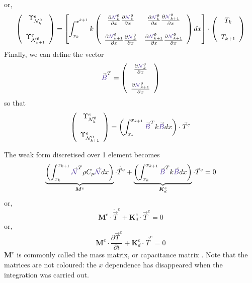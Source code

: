 or,
\[
\left(
\begin{array}{cc}
{\Upsilon}_{\bN_k^\uptheta}^e \\ \\ 
{\Upsilon}_{\bN_{k+1}^\uptheta}^e
\end{array}
\right)
=
\left[
\int_{x_k}^{x^{k+1}}
k
\left(
\begin{array}{cc}
\frac{\partial {\color{Violet}\bN}_k^\uptheta}{\partial x}  \frac{\partial  
{\color{Violet}\bN}_{k}^\uptheta } {\partial x}   & 
\frac{\partial {\color{Violet}\bN}_k^\uptheta}{\partial x}  \frac{\partial  
{\color{Violet}\bN}_{k+1}^\uptheta } {\partial x}  
\\ \\
\frac{\partial {\color{Violet}\bN}_{k+1}^\uptheta}{\partial x}  \frac{\partial  
{\color{Violet}\bN}_{k}^\uptheta } {\partial x}   & 
\frac{\partial {\color{Violet}\bN}_{k+1}^\uptheta}{\partial x}  \frac{\partial  
{\color{Violet}\bN}_{k+1}^\uptheta } {\partial x}  
\end{array}
\right)
dx
\right]
\cdot
\left(
\begin{array}{c}
T_k \\ \\ T_{k+1}
\end{array}
\right)
\]
Finally, we can define the vector 
\[
{\vec {\color{Violet}B}}^T=
\left(
\begin{array}{cc}
\frac{\partial {\color{Violet}\bN}_k^\uptheta}{\partial x}   \\ \\
\frac{\partial {\color{Violet}\bN}_{k+1}^\uptheta}{\partial x}
\end{array}
\right)
\]
so that 
\[
\left(
\begin{array}{cc}
{\Upsilon}_{\bN_k^\uptheta}^e \\ \\ 
{\Upsilon}_{\bN_{k+1}^\uptheta}^e
\end{array}
\right)
=
\left( \int_{x_k}^{x_{k+1}}   {\vec {\color{Violet}B}}^T 
k {\vec {\color{Violet}B}} dx  \right) \cdot {\vec T}^e
\]

The weak form discretised over 1 element becomes
\[
\underbrace{\left( \int_{x_k}^{x_{k+1}}   {\vec {\color{Violet}\bN}}^T 
\rho C_p {\vec {\color{Violet}\bN}} dx  \right) }_{\bm M^e} \cdot \dot{\vec T}^e
+
\underbrace{\left( \int_{x_k}^{x_{k+1}}   {\vec {\color{Violet}B}}^T k 
{\vec {\color{Violet}B}} dx  \right)}_{{\bm K}_d^e} \cdot {\vec T}^e
=0
\]
or,
\[
\boxed{
{\bm M}^e \cdot \dot{\vec T}^e + {\bm K}_d^e \cdot {\vec T}^e = 0
}
\]
or,
\[
\boxed{
{\bm M}^e \cdot \frac{\partial {\vec T}^e}{\partial t} + {\bm K}_d^e \cdot {\vec T}^e = 0
}
\]
${\bm M}^e$ is commonly called the {\color{olive}mass matrix}, or capacitance matrix \cite[p103]{reddybook2}.
Note that the matrices are not coloured: the $x$ dependence has disappeared when 
the integration was carried out.



